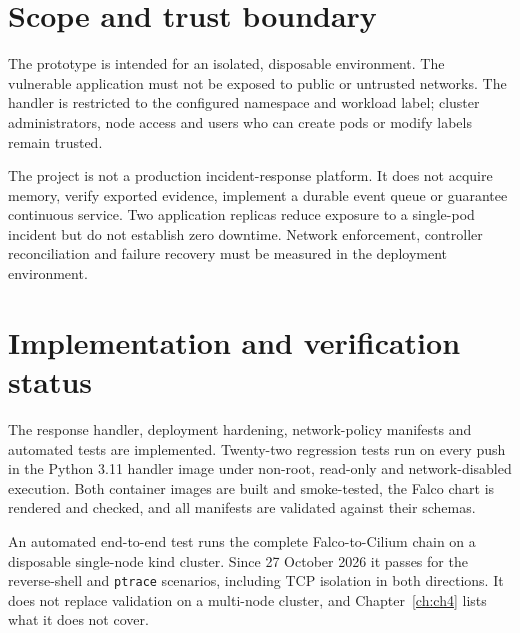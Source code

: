 \section{Scope and trust boundary}
The prototype is intended for an isolated, disposable environment. The vulnerable
application must not be exposed to public or untrusted networks. The handler is
restricted to the configured namespace and workload label; cluster administrators,
node access and users who can create pods or modify labels remain trusted.

The project is not a production incident-response platform. It does not acquire
memory, verify exported evidence, implement a durable event queue or guarantee
continuous service. Two application replicas reduce exposure to a single-pod
incident but do not establish zero downtime. Network enforcement, controller
reconciliation and failure recovery must be measured in the deployment environment.

\section{Implementation and verification status}
The response handler, deployment hardening, network-policy manifests and automated
tests are implemented. Twenty-two regression tests run on every push in the Python
3.11 handler image under non-root, read-only and network-disabled execution. Both container
images are built and smoke-tested, the Falco chart is rendered and checked, and all
manifests are validated against their schemas.

An automated end-to-end test runs the complete Falco-to-Cilium chain on a disposable
single-node kind cluster. Since 27 October 2026 it passes for the reverse-shell and
\texttt{ptrace} scenarios, including TCP isolation in both directions. It does not
replace validation on a multi-node cluster, and Chapter~\ref{ch:ch4} lists what it
does not cover.

